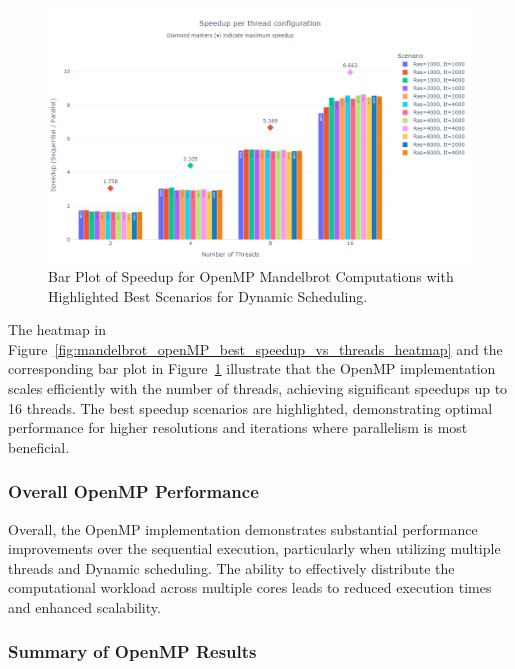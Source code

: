 \documentclass[
	report, %
	11pt, %
]{CSUniSchoolLabReport}
\newcounter{ct}
\begin{document}
\begin{figure}[H]
	\centering
	\captionsetup{justification=centering, width=.8\linewidth}
	\includegraphics[width=\textwidth]{./img/mandelbrot_openmp_best_speedup_vs_threads_bar.png}
	\caption{Bar Plot of Speedup for OpenMP Mandelbrot Computations with Highlighted Best Scenarios for Dynamic Scheduling.}
	\label{fig:mandelbrot_openMP_best_speedup_vs_threads_bar}
\end{figure}

The heatmap in Figure~\ref{fig:mandelbrot_openMP_best_speedup_vs_threads_heatmap} and the corresponding bar plot in Figure~\ref{fig:mandelbrot_openMP_best_speedup_vs_threads_bar} illustrate that the OpenMP implementation scales efficiently with the number of threads, achieving significant speedups up to 16 threads. The best speedup scenarios are highlighted, demonstrating optimal performance for higher resolutions and iterations where parallelism is most beneficial.

\subsubsection{Overall OpenMP Performance}

Overall, the OpenMP implementation demonstrates substantial performance improvements over the sequential execution, particularly when utilizing multiple threads and Dynamic scheduling. The ability to effectively distribute the computational workload across multiple cores leads to reduced execution times and enhanced scalability.

\subsubsection{Summary of OpenMP Results}
\end{document}
